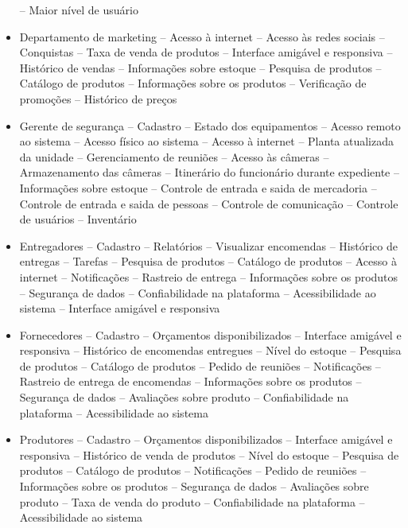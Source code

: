 \begin{itemize}
		\subitem -- Maior nível de usuário
	\item Departamento de marketing
		\subitem -- Acesso à internet
		\subitem -- Acesso às redes sociais
		\subitem -- Conquistas 
		\subitem -- Taxa de venda de produtos
		\subitem -- Interface amigável e responsiva 
		\subitem -- Histórico de vendas
		\subitem -- Informações sobre estoque
		\subitem -- Pesquisa de produtos
		\subitem -- Catálogo de produtos
		\subitem -- Informações sobre os produtos
		\subitem -- Verificação de promoções
		\subitem -- Histórico de preços
	\item Gerente de segurança
		\subitem -- Cadastro
		\subitem -- Estado dos equipamentos
		\subitem -- Acesso remoto ao sistema
		\subitem -- Acesso físico ao sistema
		\subitem -- Acesso à internet
		\subitem -- Planta atualizada da unidade
		\subitem -- Gerenciamento de reuniões
		\subitem -- Acesso às câmeras
		\subitem -- Armazenamento das câmeras
		\subitem -- Itinerário do funcionário durante expediente 
		\subitem -- Informações sobre estoque
		\subitem -- Controle de entrada e saida de mercadoria 
		\subitem -- Controle de entrada e saida de pessoas
		\subitem -- Controle de comunicação
		\subitem -- Controle de usuários
		\subitem -- Inventário
	\item Entregadores
		\subitem-- Cadastro
		\subitem -- Relatórios
		\subitem -- Visualizar encomendas
		\subitem -- Histórico de entregas
		\subitem -- Tarefas
		\subitem -- Pesquisa de produtos
		\subitem -- Catálogo de produtos
		\subitem -- Acesso à internet
		\subitem -- Notificações 
		\subitem -- Rastreio de entrega
		\subitem -- Informações sobre os produtos
		\subitem -- Segurança de dados
		\subitem -- Confiabilidade na plataforma
		\subitem -- Acessibilidade ao sistema
		\subitem -- Interface amigável e responsiva 
	\item Fornecedores
		\subitem -- Cadastro
		\subitem -- Orçamentos disponibilizados 
		\subitem -- Interface amigável e responsiva 
		\subitem -- Histórico de encomendas entregues
		\subitem -- Nível do estoque
		\subitem -- Pesquisa de produtos
		\subitem -- Catálogo de produtos
		\subitem -- Pedido de reuniões
		\subitem -- Notificações 
		\subitem -- Rastreio de entrega de encomendas
		\subitem -- Informações sobre os produtos
		\subitem -- Segurança de dados
		\subitem -- Avaliações sobre produto
		\subitem -- Confiabilidade na plataforma
		\subitem -- Acessibilidade ao sistema
	\item Produtores
		\subitem -- Cadastro
		\subitem -- Orçamentos disponibilizados 
		\subitem -- Interface amigável e responsiva 
		\subitem -- Histórico de venda de produtos
		\subitem -- Nível do estoque
		\subitem -- Pesquisa de produtos
		\subitem -- Catálogo de produtos
		\subitem -- Notificações 
		\subitem -- Pedido de reuniões
		\subitem -- Informações sobre os produtos
		\subitem -- Segurança de dados
		\subitem -- Avaliações sobre produto
		\subitem -- Taxa de venda do produto
		\subitem -- Confiabilidade na plataforma
		\subitem -- Acessibilidade ao sistema
\end{itemize}

